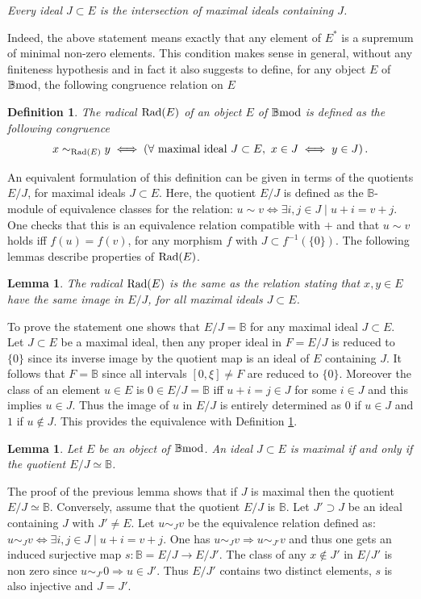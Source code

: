 \documentclass[12pt]{article}
\newtheorem{lem}[thm]{Lemma}
\newtheorem{defn}[thm]{Definition}
\def\rad{{\rm Rad}}
\def\B{{\mathbb B}}
\def\bmod{{\rm \B mod}}
\begin{document}
\centerline{\em Every ideal $J\subset E$ is the intersection of maximal ideals containing $J$.}\vspace{.05in} 

Indeed, the above statement means exactly that any element of $E^*$ is a supremum of minimal non-zero elements. This condition makes sense in general, without any finiteness hypothesis and in fact it also suggests to define, for any object $E$ of $\bmod$, the following congruence relation on $E$ 
\begin{defn}\label{defn radical} The radical $\rad(E)$ of an object $E$ of $\bmod$ is defined as the following congruence 
$$
x\sim_{\rad(E)} y\iff \left(\forall \ \text{maximal}\  \text{ideal} \ J\subset E,  \ x\in J\iff y\in J\right).
$$	
\end{defn}
An equivalent formulation of this definition can be given in terms of the quotients $E/J$, for maximal ideals $J\subset E$. Here, the quotient $E/J$ is defined as the $\B$-module of equivalence classes for the relation: $u\sim v\iff \exists i,j\in J\mid u+i=v+j$. One checks that this is an equivalence relation compatible with $+$ and that $u\sim v$ holds iff $f(u)=f(v)$, for any morphism $f$ with $J\subset f^{-1}(\{0\})$. The following lemmas describe   properties of $\rad(E)$. 
\begin{lem}\label{lem radical} The radical $\rad(E)$ is the same as the relation 
	stating that $x,y\in E$  have the same image in $E/J$, for all maximal ideals $J\subset E$. 
\end{lem}
\proof To prove the statement one shows that $E/J=\B$ for any maximal ideal $J\subset E$.  Let $J\subset E$ be a maximal ideal, then any proper ideal in $F=E/J$ is reduced to $\{0\}$ since its inverse image  by the quotient map is an ideal of $E$ containing $J$. It follows that $F=\B$ since all intervals $[0,\xi]\neq F$ are reduced to $\{0\}$. Moreover the class of an element $u\in E$ is $0\in E/J= \B$ iff $u+i=j\in J$ for some $i\in J$ and this implies $u\in J$. Thus the image of $u$ in $E/J$ is entirely determined as $0$ if $u\in J$ and $1$ if $u\notin J$. This provides the equivalence with Definition \ref{defn radical}.\endproof
 \begin{lem}\label{max ideals} Let $E$ be an object of $\bmod$. An ideal $J\subset E$ is maximal if and only if the quotient $E/J\simeq \B$.   	
   \end{lem}
   \proof The proof of the previous lemma shows that if $J$ is maximal then the quotient $E/J\simeq \B$. Conversely, assume that the quotient  $E/J$  is $\B$. Let $J'\supset J$ be an ideal containing $J$ with $J'\neq E$.  Let $u\sim_J v$ be the equivalence relation defined as: $u\sim_J v\iff \exists i,j\in J\mid u+i=v+j$. One has $u\sim_J v \Rightarrow u\sim_{J'} v$ and thus one gets an induced surjective map  $s:\B=E/J\to E/J'$. The class of any $x\notin J'$ in $E/J'$ is non zero since $u\sim_{J'} 0\Rightarrow u\in J'$. Thus $E/J'$ contains two distinct elements,  $s$ is also injective and $J=J'$. \endproof  
\end{document}
